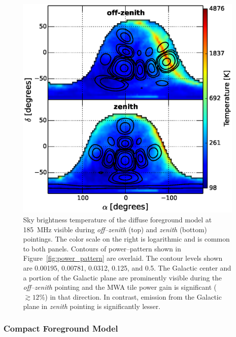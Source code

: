 \documentclass[preprint2,iop,numberedappendix]{emulateapj}
\begin{document}
\begin{figure}[htb]
\centering
\includegraphics[width=\linewidth]{figures/v1_0/dsm.eps}
\caption{Sky brightness temperature of the diffuse foreground model at 185~MHz visible during {\it off--zenith} (top) and {\it zenith} (bottom) pointings. The color scale on the right is logarithmic and is common to both panels. Contours of power--pattern shown in Figure~\ref{fig:power_pattern} are overlaid. The contour levels shown are 0.00195, 0.00781, 0.0312, 0.125, and 0.5. The Galactic center and a portion of the Galactic plane are prominently visible during the {\it off--zenith} pointing and the MWA tile power gain is significant ($\gtrsim 12$\%) in that direction. In contrast, emission from the Galactic plane in {\it zenith} pointing is significantly lesser. \label{fig:DSM}}
\end{figure}

\subsubsection{Compact Foreground Model}\label{sec:CSM}
\end{document}
